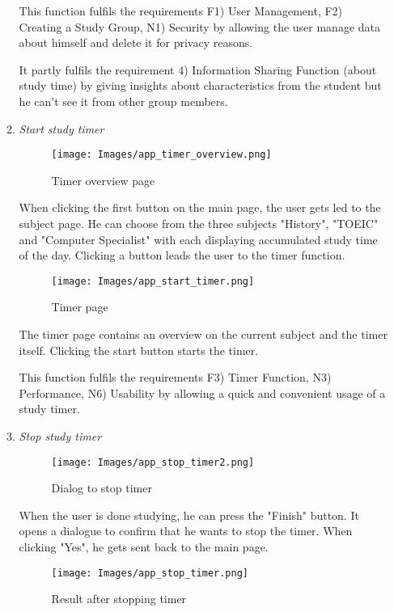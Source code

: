\documentclass[conference]{IEEEtran}
\begin{document}
\begin{enumerate}
\begin{enumerate}
This function fulfils the requirements F1) User Management, F2) Creating a Study Group, N1) Security by allowing the user manage data about himself and delete it for privacy reasons.

It partly fulfils the requirement 4) Information Sharing Function (about study time) by giving insights about characteristics from the student but he can't see it from other group members.\\

    
    \item \textit{Start study timer}
    
        \begin{figure}[htp]
    \centering
    \texttt{[image: Images/app\_timer\_overview.png]}
    \caption{Timer overview page}
\end{figure}

When clicking the first button on the main page, the user gets led to the subject page. He can choose from the three subjects "History", "TOEIC" and "Computer Specialist" with each displaying accumulated study time of the day. Clicking a button leads the user to the timer function.

    \begin{figure}[htp]
    \centering
    \texttt{[image: Images/app\_start\_timer.png]}
    \caption{Timer page}
\end{figure}

The timer page contains an overview on the current subject and the timer itself. Clicking the start button starts the timer.

This function fulfils the requirements F3) Timer Function, N3) Performance, N6) Usability by allowing a quick and convenient usage of a study timer.\\

    
    \item \textit{Stop study timer}
    
\begin{figure}[H]
    \centering
    \texttt{[image: Images/app\_stop\_timer2.png]}
    \caption{Dialog to stop timer}
\end{figure}

When the user is done studying, he can press the "Finish" button. It opens a dialogue to confirm that he wants to stop the timer. When clicking "Yes", he gets sent back to the main page.


        \begin{figure}[htp]
    \centering
    \texttt{[image: Images/app\_stop\_timer.png]}
    \caption{Result after stopping timer}
\end{figure}


\end{enumerate}
\end{enumerate}
\end{document}
